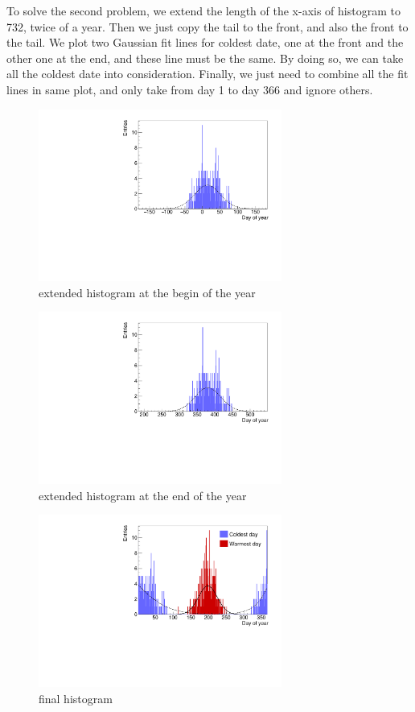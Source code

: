 \documentclass[a4paper]{article}
\begin{document}
To solve the second problem, we extend the length of the x-axis of histogram to 732, twice of a year. Then we just copy the tail to the front, and also the front to the tail. We plot two Gaussian fit lines for coldest date, one at the front and the other one at the end, and these line must be the same. By doing so, we can take all the coldest date into consideration. Finally, we just need to combine all the fit lines in same plot, and only take from day 1 to day 366 and ignore others.
\begin{figure}[htp]
    \centering
    \includegraphics[width=8cm]{./images/hotCold_Upp_cold_1}
    \caption{extended histogram at the begin of the year}
    \label{fig:hist}
\end{figure}
\begin{figure}[htp]
    \centering
    \includegraphics[width=8cm]{./images/hotCold_Upp_cold_2}
    \caption{extended histogram at the end of the year}
    \label{fig:hist}
\end{figure}
\begin{figure}[htp]
    \centering
    \includegraphics[width=8cm]{./images/hotCold_Upp_final}
    \caption{final histogram}
    \label{fig:hist}
\end{figure}
\end{document}
